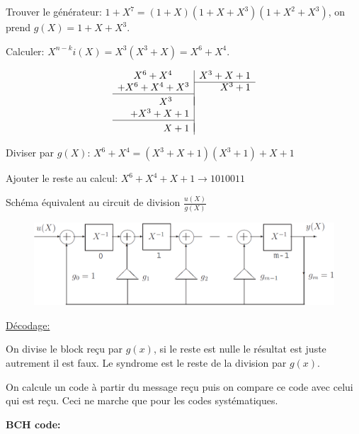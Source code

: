Trouver le générateur: $1+X^7=(1+X)(1+X+X^3)(1+X^2+X^3)$, on prend $g(X)=1+X+X^3$.

Calculer: $X^{n-k}i(X)=X^3(X^3+X)=X^6+X^4$.

\setlength{\abovedisplayskip}{-2pt}
\setlength{\belowdisplayskip}{-2pt}
\begin{figure}
    \[
        \begin{array}{r|r}
            X^6 + X^4\phantom{{}+6} & X^3 + X + 1 \\ \cline{2-2}
            + X^6 + X^4 +X^3        & X^3 + 1     \\ \cline{1-1} \\[\dimexpr-\normalbaselineskip+\jot]
            X^3\phantom{{}+6}                     \\
            +X^3 + X + 1                          \\ \cline{1-1} \\[\dimexpr-\normalbaselineskip+\jot]
            X + 1
        \end{array}
    \]
\end{figure}
Diviser par $g(X)$: $X^6+X^4=(X^3 + X + 1)(X^3 + 1)+X+1$

Ajouter le reste au calcul: $X^6+X^4+X+1\rightarrow 1010011$

Schéma équivalent au circuit de division $\frac{u(X)}{g(X)}$
\vspace*{0.5cm}
\begin{figure}[H]
    \includegraphics[width=\linewidth]{images/schema_division.png}
\end{figure}

\columnbreak

\underline{Décodage:}

On divise le block reçu par $g(x)$, si le reste est nulle le
résultat est juste autrement il est faux. Le syndrome est
le reste de la division par $g(x)$.

On calcule un code à partir du message reçu puis on
compare ce code avec celui qui est reçu. Ceci ne marche
que pour les codes systématiques.

\textbf{BCH code:}

